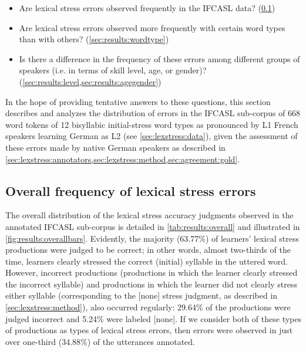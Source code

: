 		\begin{itemize}
	\item{Are lexical stress errors observed frequently in the IFCASL data? (\cref{sec:results:overall})}
	\item{Are lexical stress errors observed more frequently with certain word types than with others?  (\cref{sec:results:wordtype})}
	\item{Is there a difference in the frequency of these errors among different groups of speakers (i.e. in terms of skill level, age, or gender)? (\cref{sec:results:level,sec:results:agegender})
	}
	\end{itemize}
	
		In the hope of providing tentative answers to these questions, this section describes and analyzes the distribution of errors in the IFCASL sub-corpus of 668 word tokens of 12 bisyllabic initial-stress word types as pronounced by L1 French speakers learning German as L2 (see \cref{sec:lexstress:data}), given the assessment of these errors made by native German speakers as described in \cref{sec:lexstress:annotators,sec:lexstress:method,sec:agreement:gold}.
			
		\subsection{Overall frequency of lexical stress errors}
		\label{sec:results:overall}
		
		
		The overall distribution of the lexical stress accuracy judgments observed in the annotated IFCASL sub-corpus is detailed in \cref{tab:results:overall} and illustrated in \cref{fig:results:overallbars}. Evidently, the majority (63.77\%) of learners' lexical stress productions were judged to be correct; in other words, almost two-thirds of the time, learners 
		clearly stressed the correct (initial) syllable in the uttered word.
		However, incorrect productions (productions in which the learner clearly stressed the incorrect syllable) and productions in which the learner did not clearly stress either syllable (corresponding to the [none] stress judgment, as described in \cref{sec:lexstress:method}), also occurred regularly: 29.64\% of the productions were judged incorrect and 5.24\% were labeled [none]. If we consider both of these types of productions as types of lexical stress errors, then errors were observed in just over one-third (34.88\%) of the  utterances annotated. 
		
